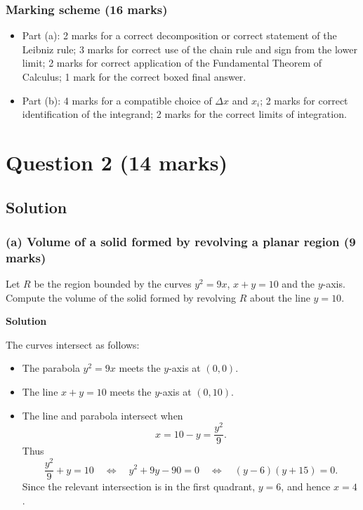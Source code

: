 \documentclass[12pt]{article}
\begin{document}
\subsubsection{Marking scheme \hfill (16 marks)}
\begin{itemize}
  \item Part (a): 2 marks for a correct decomposition or correct statement of the Leibniz rule; 3 marks for correct use of the chain rule and sign from the lower limit; 2 marks for correct application of the Fundamental Theorem of Calculus; 1 mark for the correct boxed final answer.
  \item Part (b): 4 marks for a compatible choice of \(\Delta x\) and \(x_i\); 2 marks for correct identification of the integrand; 2 marks for the correct limits of integration.
\end{itemize}

\newpage
\section[Question 2 (14 marks)]{Question 2 \hfill (14 marks)}

\subsection{Solution}

\subsubsection{(a) Volume of a solid formed by revolving a planar region \hfill (9 marks)}

Let \(R\) be the region bounded by the curves \(y^2=9x\), \(x+y=10\) and the \(y\)-axis. Compute the volume of the solid formed by revolving \(R\) about the line \(y=10\).

\textbf{Solution}

The curves intersect as follows:
\begin{itemize}
  \item The parabola \(y^2=9x\) meets the \(y\)-axis at \((0,0)\).
  \item The line \(x+y=10\) meets the \(y\)-axis at \((0,10)\).
  \item The line and parabola intersect when
  \[
  x=10-y=\frac{y^2}{9}.
  \]
  Thus
  \[
  \frac{y^2}{9}+y=10
  \quad\Longleftrightarrow\quad
  y^2+9y-90=0
  \quad\Longleftrightarrow\quad
  (y-6)(y+15)=0.
  \]
  Since the relevant intersection is in the first quadrant, \(y=6\), and hence \(x=4\).
\end{itemize}
\end{document}
